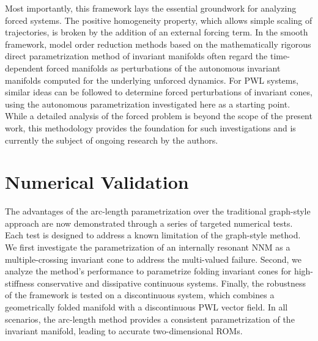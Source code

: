 \documentclass[a4paper,9pt,parskip=half,english]{article}
\theoremstyle{plain}
\theoremstyle{definition}
\begin{document}
Most importantly, this framework lays the essential groundwork for analyzing forced systems. The positive homogeneity property, which allows simple scaling of trajectories, is broken by the addition of an external forcing term. In the smooth framework, model order reduction methods based on the mathematically rigorous direct parametrization method of invariant manifolds often regard the time-dependent forced manifolds as perturbations of the autonomous invariant manifolds computed for the underlying unforced dynamics. For PWL systems, similar ideas can be followed to determine forced perturbations of invariant cones, using the autonomous parametrization investigated here as a starting point. While a detailed analysis of the forced problem is beyond the scope of the present work, this methodology provides the foundation for such investigations and is currently the subject of ongoing research by the authors.  

\section{Numerical Validation}\label{Section_NumValidation}
The advantages of the arc-length parametrization over the traditional graph-style approach are now demonstrated through a series of targeted numerical tests. Each test is designed to address a known limitation of the graph-style method. We first investigate the parametrization of an internally resonant NNM as a multiple-crossing invariant cone to address the multi-valued failure. Second, we analyze the method's performance to parametrize folding invariant cones for high-stiffness conservative and dissipative continuous systems. Finally, the robustness of the framework is tested on a discontinuous system, which combines a geometrically folded manifold with a discontinuous PWL vector field. In all scenarios, the arc-length method provides a consistent parametrization of the invariant manifold, leading to accurate two-dimensional ROMs.
\end{document}
